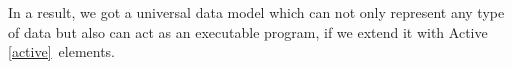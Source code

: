 \label{active}\secdown


In a result, we got a universal data model which can not only represent any type
of data but also can act as an executable program, if we extend it with Active
\ref{active}\ elements.



\secup

